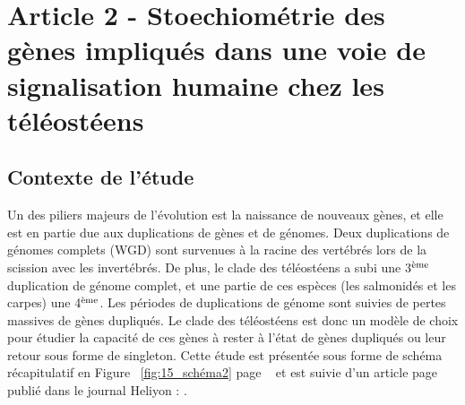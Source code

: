 \chapter{Article 2 - Stoechiométrie des gènes impliqués dans une voie de signalisation humaine chez les téléostéens}
\thispagestyle{firstpage}
\onehalfspacing

\section{Contexte de l'étude}
\par Un des piliers majeurs de l’évolution est la naissance de nouveaux gènes, et elle est en partie due aux duplications de gènes et de génomes. Deux duplications de génomes complets (WGD) sont survenues à la racine des vertébrés lors de la scission avec les invertébrés. De plus, le clade des téléostéens a subi une 3$\textsuperscript{ème}$ duplication de génome complet, et une partie de ces espèces (les salmonidés et les carpes) une 4$\textsuperscript{ème}$. Les périodes de duplications de génome sont suivies de pertes massives de gènes dupliqués. Le clade des téléostéens est donc un modèle de choix pour étudier la capacité de ces gènes à rester à l’état de gènes dupliqués ou leur retour sous forme de singleton. Cette étude est présentée sous forme de schéma récapitulatif en Figure ~\ref{fig:15_schéma2} page ~\pageref{fig:15_schéma2} et est suivie d’un article page \pageref{art2} publié dans le journal Heliyon : \cite{picolo_genes_2023}.

